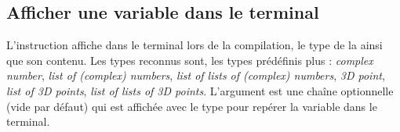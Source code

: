 \subsection{Afficher une variable dans le terminal}

L'instruction  affiche dans le terminal lors de la compilation, le type de la  ainsi que son contenu. Les types reconnus sont, les types prédéfinis plus : \emph{complex number}, \emph{list of (complex) numbers}, \emph{list of lists of (complex) numbers}, \emph{3D point}, \emph{list of 3D points}, \emph{list of lists of 3D points}. L'argument  est une chaîne optionnelle (vide par défaut) qui est affichée avec le type pour repérer la variable dans le terminal.
